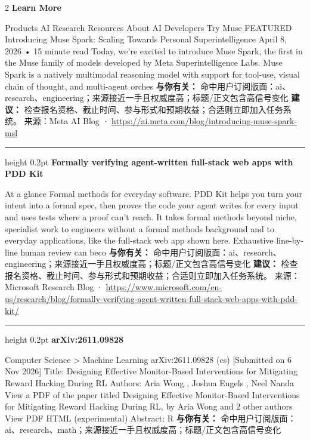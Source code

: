 \documentclass[10.5pt]{ctexart}
\begin{document}
\begin{multicols}{2}
{\large\bfseries Learn More}\par
Products AI Research Resources About AI Developers Try Muse FEATURED Introducing Muse Spark: Scaling Towards Personal Superintelligence April 8, 2026 • 15 minute read Today, we’re excited to introduce Muse Spark, the first in the Muse family of models developed by Meta Superintelligence Labs. Muse Spark is a natively multimodal reasoning model with support for tool-use, visual chain of thought, and multi-agent orches
\textbf{与你有关：} 命中用户订阅版面：ai、research、engineering；来源接近一手且权威度高；标题/正文包含高信号变化
\textbf{建议：} 检查报名资格、截止时间、参与形式和预期收益；合适则立即加入任务系统。
{\footnotesize\color{ormuted} 来源：Meta AI Blog · \url{https://ai.meta.com/blog/introducing-muse-spark-msl}}
\vspace{2mm}
\hrule height 0.2pt
\vspace{2mm}
{\large\bfseries Formally verifying agent-written full-stack web apps with PDD Kit}\par
At a glance Formal methods for everyday software. PDD Kit helps you turn your intent into a formal spec, then proves the code your agent writes for every input and uses tests where a proof can’t reach. It takes formal methods beyond niche, specialist work to engineers without a formal methods background and to everyday applications, like the full-stack web app shown here. Exhaustive line-by-line human review can beco
\textbf{与你有关：} 命中用户订阅版面：ai、research、engineering；来源接近一手且权威度高；标题/正文包含高信号变化
\textbf{建议：} 检查报名资格、截止时间、参与形式和预期收益；合适则立即加入任务系统。
{\footnotesize\color{ormuted} 来源：Microsoft Research Blog · \url{https://www.microsoft.com/en-us/research/blog/formally-verifying-agent-written-full-stack-web-apps-with-pdd-kit/}}
\vspace{2mm}
\hrule height 0.2pt
\vspace{2mm}
{\large\bfseries arXiv:2611.09828}\par
Computer Science > Machine Learning arXiv:2611.09828 (cs) [Submitted on 6 Nov 2026] Title: Designing Effective Monitor-Based Interventions for Mitigating Reward Hacking During RL Authors: Aria Wong , Joshua Engels , Neel Nanda View a PDF of the paper titled Designing Effective Monitor-Based Interventions for Mitigating Reward Hacking During RL, by Aria Wong and 2 other authors View PDF HTML (experimental) Abstract: R
\textbf{与你有关：} 命中用户订阅版面：ai、research、math；来源接近一手且权威度高；标题/正文包含高信号变化

\end{multicols}
\end{document}
